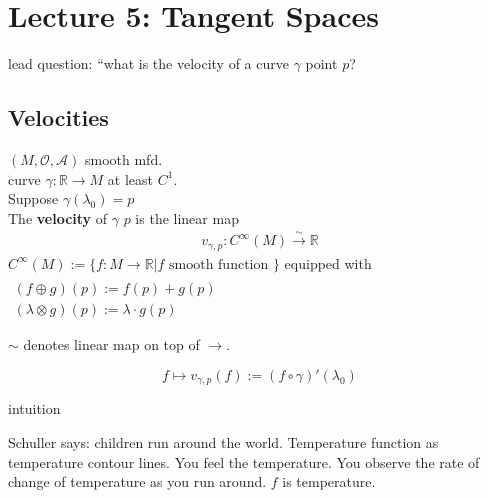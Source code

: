 \section{Lecture 5: Tangent Spaces}

lead question: ``what is the velocity of a curve $\gamma$ \@ point $p$?

\subsection{Velocities}

\begin{definition}
  $(M,\mathcal{O},\mathcal{A})$ smooth mfd. \\
  curve $\gamma : \mathbb{R} \to M$ at least $C^1$.   \\
  Suppose $\gamma(\lambda_0) =p$ \\
  The \textbf{velocity} of $\gamma$ \@ $p$ is the linear map 
\[
\begin{gathered}
v_{\gamma, p} : C^{\infty}(M) \xrightarrow{ \sim } \mathbb{R}
\end{gathered}
\]
$C^{\infty}(M) := \lbrace f: M \to \mathbb{R} | f \text{ smooth function } \rbrace$ equipped with $\begin{gathered}  \quad \\ 
   (f\oplus g)(p) := f(p) + g(p) \\
   (\lambda \otimes g)(p) := \lambda \cdot g(p) \end{gathered}$

$\sim$ denotes linear map on top of $\xrightarrow{}$.

\[
f \mapsto v_{\gamma,p}(f):= (f\circ \gamma)'(\lambda_0)
\]


\end{definition}

intuition



Schuller says: children run around the world.  Temperature function as temperature contour lines.  You feel the temperature.  You observe the rate of change of temperature as you run around.  $f$ is temperature.  

